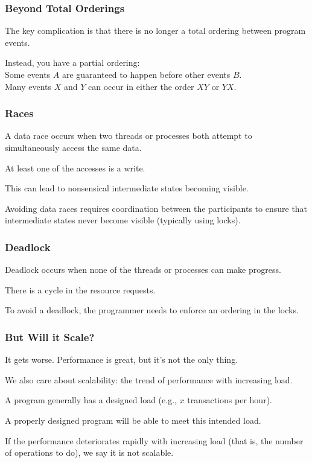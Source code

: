 \begin{frame}
\frametitle{Beyond Total Orderings}
\Large
The key complication is that there is no longer a total ordering between
program events. 

Instead, you have a partial ordering:\\
\quad Some events $A$ are guaranteed to happen before other events $B$.\\
\quad Many events $X$  and $Y$ can occur in either the order $XY$ or $YX$.

\end{frame}



\begin{frame}
\frametitle{Races}
\Large

 A \alert{data race} occurs when two threads or processes both attempt to
simultaneously access the same data.

At least one of the accesses is a write. 

This can lead to nonsensical intermediate states becoming
visible.

Avoiding data races requires
coordination between the participants to ensure that intermediate
states never become visible (typically using locks). 


\end{frame}



\begin{frame}
\frametitle{Deadlock}
\Large

 \alert{Deadlock}
occurs when none of the threads or processes can make progress.

There is a cycle in the resource requests. 

To avoid a deadlock, the programmer needs to enforce an ordering in the locks.


\end{frame}



\begin{frame}
\frametitle{But Will it Scale?}
\Large

It gets worse. Performance is great, but it's not the only thing. 

We also care about \alert{scalability}: the trend of performance with increasing load. 

A program generally has a designed load (e.g., $x$ transactions per hour). 

A properly designed program will be able to meet this intended load. 

If the performance deteriorates rapidly with increasing load (that is, the number of operations to do), we say it is \alert{not scalable}.

\end{frame}



